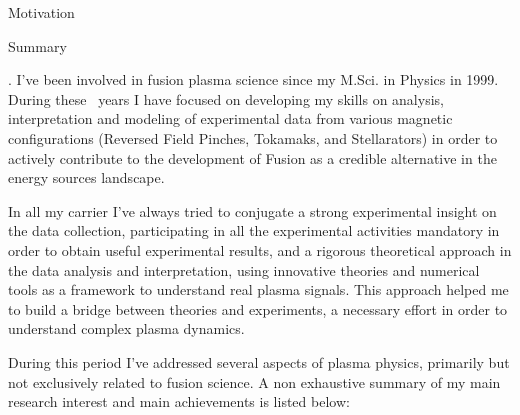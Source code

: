 \begin{cvblock}{Motivation}
\end{cvblock}
\begin{cvblock}{Summary}
 \end{cvblock}.
I've been involved in fusion plasma science since my M.Sci. in
Physics in 1999. During these
\FPtrunc{}\mydegree\ years
I have focused on developing my skills on analysis,
interpretation and modeling of experimental data from various
magnetic configurations (Reversed Field Pinches, Tokamaks, and
Stellarators) in order to actively contribute to the development of
Fusion as a credible alternative in the energy sources landscape.

In all my carrier I've always tried to conjugate a strong experimental
insight on the data collection, participating in all the experimental
activities mandatory in order to obtain useful experimental results, and a rigorous theoretical approach in
the data analysis and interpretation, using innovative theories and numerical
tools as a framework to understand real plasma signals. This
approach helped me to build a bridge between theories and experiments,
a necessary effort in order to understand complex plasma dynamics.

During this period I've addressed several aspects of plasma physics,
primarily but not exclusively related to 
fusion science. A non exhaustive summary of my main research interest
and main achievements is listed below: 

